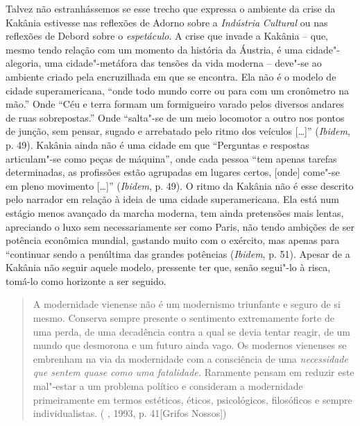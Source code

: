 Talvez não estranhássemos se esse trecho que expressa o ambiente da
crise da Kakânia estivesse nas reflexões de Adorno sobre a
\emph{Indústria} \emph{Cultural} ou nas reflexões de Debord
sobre o \emph{espetáculo}. A crise que invade a Kakânia -- que,
mesmo tendo relação com um momento da história da Áustria, é uma
cidade"-alegoria, uma cidade"-metáfora das tensões da vida moderna --
deve"-se ao ambiente criado pela encruzilhada em que se encontra. Ela não é o modelo de cidade
superamericana, ``onde todo mundo corre ou para com um cronômetro na
mão.'' Onde ``Céu e terra formam um formigueiro varado pelos diversos
andares de ruas sobrepostas.'' Onde ``salta"-se de um meio locomotor a
outro nos pontos de junção, sem pensar, sugado e arrebatado pelo ritmo
dos veículos [\ldots{}]'' (\emph{Ibidem}, p. 49). Kakânia ainda não é uma cidade
em que ``Perguntas e respostas articulam"-se como peças de máquina'',
onde cada pessoa ``tem apenas tarefas determinadas, as profissões estão
agrupadas em lugares certos, [onde] come"-se em pleno movimento
[\ldots{}]'' (\emph{Ibidem}, p. 49). O ritmo da Kakânia não é esse descrito
pelo narrador em relação à ideia de uma cidade superamericana. Ela está
num estágio menos avançado da marcha moderna, tem ainda pretensões mais
lentas, apreciando o luxo sem necessariamente ser como Paris, não tendo
ambições de ser potência econômica mundial, gastando muito com o
exército, mas apenas para ``continuar sendo a penúltima das grandes
potências (\emph{Ibidem}, p. 51). Apesar de a Kakânia não seguir aquele
modelo, pressente ter que, senão segui"-lo à risca, tomá-lo como
horizonte a ser seguido.

\begin{quote}
A modernidade vienense não é um modernismo triunfante e seguro de si
mesmo. Conserva sempre presente o sentimento extremamente forte de uma
perda, de uma decadência contra a qual se devia tentar reagir, de um
mundo que desmorona e um futuro ainda vago. Os modernos vienenses se
embrenham na via da modernidade com a consciência de uma
\emph{necessidade que sentem quase como uma fatalidade.} Raramente
pensam em reduzir este mal"-estar a um problema político e consideram a
modernidade primeiramente em termos estéticos, éticos, psicológicos,
filosóficos e sempre individualistas. ( , 1993, p. 41[Grifos
Nossos])
\end{quote}

